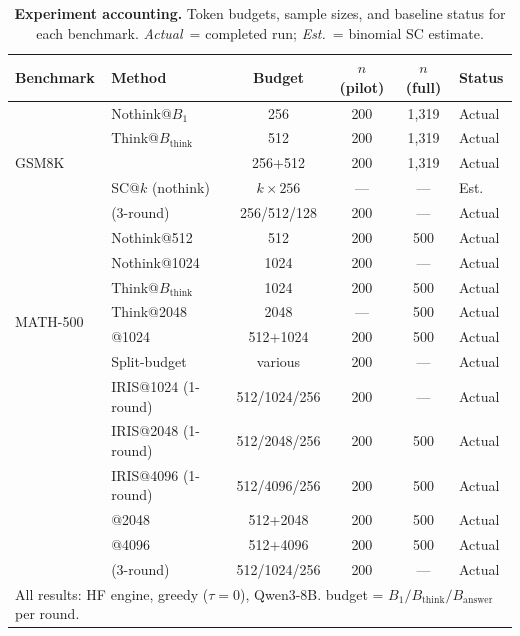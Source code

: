 \begin{table}[t]
\centering
\caption{\textbf{Experiment accounting.} Token budgets, sample sizes, and
baseline status for each benchmark.
\textit{Actual}~= completed run;
\textit{Est.}~= binomial SC estimate.}
\label{tab:experiment-accounting}
\small
\setlength{\tabcolsep}{4pt}
\begin{tabular}{llcccl}
\toprule
\textbf{Benchmark} & \textbf{Method} & \textbf{Budget} & \textbf{$n$ (pilot)} & \textbf{$n$ (full)} & \textbf{Status} \\
\midrule
\multirow{5}{*}{GSM8K}
 & Nothink@$B_1$     & 256   & 200   & 1{,}319 & Actual \\
 & Think@$B_{\text{think}}$ & 512 & 200 & 1{,}319 & Actual \\
 & \town{}            & 256+512 & 200 & 1{,}319 & Actual \\
 & SC@$k$ (nothink)   & $k{\times}256$ & --- & --- & Est. \\
 & \method{} (3-round) & 256/512/128 & 200 & --- & Actual \\
\midrule
\multirow{7}{*}{MATH-500}
 & Nothink@512        & 512   & 200   & 500 & Actual \\
 & Nothink@1024       & 1024  & 200   & --- & Actual \\
 & Think@$B_{\text{think}}$ & 1024 & 200 & 500 & Actual \\
 & Think@2048         & 2048  & ---   & 500 & Actual \\
 & \town{}@1024       & 512+1024 & 200 & 500 & Actual \\
 & Split-budget       & various & 200 & --- & Actual \\
 & IRIS@1024 (1-round) & 512/1024/256 & 200 & --- & Actual \\
 & IRIS@2048 (1-round) & 512/2048/256 & 200 & 500 & Actual \\
 & IRIS@4096 (1-round) & 512/4096/256 & 200 & 500 & Actual \\
 & \town{}@2048       & 512+2048 & 200 & 500 & Actual \\
 & \town{}@4096       & 512+4096 & 200 & 500 & Actual \\
 & \method{} (3-round) & 512/1024/256 & 200 & --- & Actual \\
\bottomrule
\multicolumn{6}{l}{\scriptsize All results: HF engine, greedy ($\tau{=}0$), Qwen3-8B. \method{} budget = $B_1/B_{\text{think}}/B_{\text{answer}}$ per round.}
\end{tabular}
\end{table}

